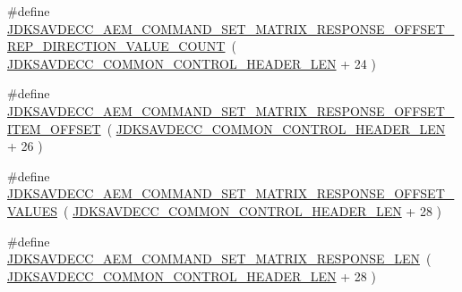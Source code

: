 \begin{DoxyCompactItemize}
\item 
\#define \hyperlink{group__command__set__matrix__response_gaaf0811d3a1bbcab62e0c270482038189}{J\+D\+K\+S\+A\+V\+D\+E\+C\+C\+\_\+\+A\+E\+M\+\_\+\+C\+O\+M\+M\+A\+N\+D\+\_\+\+S\+E\+T\+\_\+\+M\+A\+T\+R\+I\+X\+\_\+\+R\+E\+S\+P\+O\+N\+S\+E\+\_\+\+O\+F\+F\+S\+E\+T\+\_\+\+R\+E\+P\+\_\+\+D\+I\+R\+E\+C\+T\+I\+O\+N\+\_\+\+V\+A\+L\+U\+E\+\_\+\+C\+O\+U\+NT}~( \hyperlink{group__jdksavdecc__avtp__common__control__header_gaae84052886fb1bb42f3bc5f85b741dff}{J\+D\+K\+S\+A\+V\+D\+E\+C\+C\+\_\+\+C\+O\+M\+M\+O\+N\+\_\+\+C\+O\+N\+T\+R\+O\+L\+\_\+\+H\+E\+A\+D\+E\+R\+\_\+\+L\+EN} + 24 )
\item 
\#define \hyperlink{group__command__set__matrix__response_ga525adaaa6c02823aab4f241df774cb93}{J\+D\+K\+S\+A\+V\+D\+E\+C\+C\+\_\+\+A\+E\+M\+\_\+\+C\+O\+M\+M\+A\+N\+D\+\_\+\+S\+E\+T\+\_\+\+M\+A\+T\+R\+I\+X\+\_\+\+R\+E\+S\+P\+O\+N\+S\+E\+\_\+\+O\+F\+F\+S\+E\+T\+\_\+\+I\+T\+E\+M\+\_\+\+O\+F\+F\+S\+ET}~( \hyperlink{group__jdksavdecc__avtp__common__control__header_gaae84052886fb1bb42f3bc5f85b741dff}{J\+D\+K\+S\+A\+V\+D\+E\+C\+C\+\_\+\+C\+O\+M\+M\+O\+N\+\_\+\+C\+O\+N\+T\+R\+O\+L\+\_\+\+H\+E\+A\+D\+E\+R\+\_\+\+L\+EN} + 26 )
\item 
\#define \hyperlink{group__command__set__matrix__response_ga6ff4c025a626586aa08ab756c505d096}{J\+D\+K\+S\+A\+V\+D\+E\+C\+C\+\_\+\+A\+E\+M\+\_\+\+C\+O\+M\+M\+A\+N\+D\+\_\+\+S\+E\+T\+\_\+\+M\+A\+T\+R\+I\+X\+\_\+\+R\+E\+S\+P\+O\+N\+S\+E\+\_\+\+O\+F\+F\+S\+E\+T\+\_\+\+V\+A\+L\+U\+ES}~( \hyperlink{group__jdksavdecc__avtp__common__control__header_gaae84052886fb1bb42f3bc5f85b741dff}{J\+D\+K\+S\+A\+V\+D\+E\+C\+C\+\_\+\+C\+O\+M\+M\+O\+N\+\_\+\+C\+O\+N\+T\+R\+O\+L\+\_\+\+H\+E\+A\+D\+E\+R\+\_\+\+L\+EN} + 28 )
\item 
\#define \hyperlink{group__command__set__matrix__response_ga2e35d80d27f6e6764556c6a0f3486f78}{J\+D\+K\+S\+A\+V\+D\+E\+C\+C\+\_\+\+A\+E\+M\+\_\+\+C\+O\+M\+M\+A\+N\+D\+\_\+\+S\+E\+T\+\_\+\+M\+A\+T\+R\+I\+X\+\_\+\+R\+E\+S\+P\+O\+N\+S\+E\+\_\+\+L\+EN}~( \hyperlink{group__jdksavdecc__avtp__common__control__header_gaae84052886fb1bb42f3bc5f85b741dff}{J\+D\+K\+S\+A\+V\+D\+E\+C\+C\+\_\+\+C\+O\+M\+M\+O\+N\+\_\+\+C\+O\+N\+T\+R\+O\+L\+\_\+\+H\+E\+A\+D\+E\+R\+\_\+\+L\+EN} + 28 )
\end{DoxyCompactItemize}
